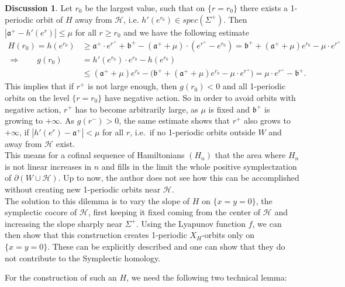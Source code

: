 \documentclass[a4paper,12pt,bibliography=totocnumbered,titlepage=false,abstracton,bookmarksnumbered=true]{scrartcl}
\theoremstyle{definition}
\newtheorem{dis}[defn]{Discussion}
\begin{document}
\begin{dis}
 Let $r_0$ be the largest value, such that on $\{r{=}r_0\}$ there exists a 1-periodic orbit of $H$ away from $\mathcal{H}$, i.e. $h'(e^{r_0})\in spec(\Sigma^+)$. Then $|\mathfrak{a}^+-h'(e^r)|\leq \mu$ for all $r\geq r_0$ and we have the following estimate
\begin{align*}
 H(r_0)=h(e^{r_0})&\geq \mathfrak{a}^+{\cdot} e^{r^+}+\mathfrak{b}^+-(\mathfrak{a}^+{+}\mu)\cdot(e^{r^+}{-}e^{r_0})=\mathfrak{b}^++(\mathfrak{a}^+{+}\mu) e^{r_0}-\mu{\cdot} e^{r^+}\\
 \Longrightarrow\qquad g(r_0) &=h'(e^{r_0}){\cdot} e^{r_0}-h(e^{r_0})\\
  &\leq (\mathfrak{a}^+{+}\mu) e^{r_0}-\big(\mathfrak{b}^++(\mathfrak{a}^+{+}\mu) e^{r_0}-\mu{\cdot} e^{r^+}\big)= \mu{\cdot} e^{r^+}-\mathfrak{b}^+.
\end{align*}
This implies that if $r^+$ is not large enough, then $g(r_0)<0$ and all 1-periodic orbits on the level $\{r=r_0\}$ have negative action. So in order to avoid orbits with negative action, $r^+$ has to become arbitrarily large, as $\mu$ is fixed and $\mathfrak{b}^+$ is growing to $+\infty$. As $g(r^-)>0$, the same estimate shows that $r^+$ also grows to $+\infty$, if $|h'(e^r){-}\mathfrak{a}^+|< \mu$ for all $r$, i.e.\ if no 1-periodic orbits outside $W$ and away from $\mathcal{H}$ exist.\\
This means for a cofinal sequence of Hamiltonians $(H_n)$ that the area where $H_n$ is not linear increases in $n$ and fills in the limit the whole positive symplectzation of $\partial(W{\cup}\mathcal{H})$. Up to now, the author does not see how this can be accomplished without creating new 1-periodic orbits near $\mathcal{H}$.\bigskip\\
The solution to this dilemma is to vary the slope of $H$ on $\{x{=}y{=}0\}$, the symplectic cocore of $\mathcal{H}$, first keeping it fixed coming from the center of $\mathcal{H}$ and increasing the slope sharply near $\Sigma^+$. Using the Lyapunov function $f$, we can then show that this construction creates 1-periodic $X_H$-orbits only on $\{x{=}y{=}0\}$. These can be explicitly described and one can show that they do not contribute to the Symplectic homology.
\end{dis}
For the construction of such an $H$, we need the following two technical lemma:
\end{document}
